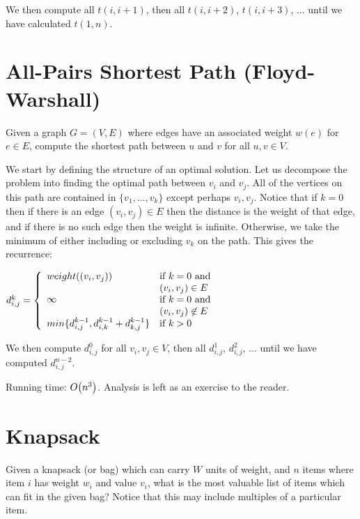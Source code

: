 We then compute all $t(i,i+1)$, then all $t(i,i+2)$, $t(i,i+3)$,
... until we have calculated $t(1,n)$.

\hypertarget{sec:floyd_warshall}{\section{All-Pairs Shortest Path
    (Floyd-Warshall)}}

Given a graph $G=(V,E)$ where edges have an associated weight $w(e)$
for $e \in E$, compute the shortest path between $u$ and $v$ for all
$u,v \in V$.

We start by defining the structure of an optimal solution.  Let us
decompose the problem into finding the optimal path between $v_i$ and
$v_j$.  All of the vertices on this path are contained in $\{
v_1,...,v_k \}$ except perhaps $v_i,v_j$.  Notice that if $k=0$ then
if there is an edge $(v_i,v_j) \in E$ then the distance is the weight
of that edge, and if there is no such edge then the weight is
infinite.  Otherwise, we take the minimum of either including or
excluding $v_k$ on the path.  This gives the recurrence:

\begin{math}
  d^k_{i,j} = \left\{
    \begin{array}{l l}
      weight((v_i,v_j)) & \text{if $k=0$ and} \\
                        & (v_i,v_j) \in E \\
      \infty            & \text{if $k=0$ and} \\
                        & (v_i,v_j) \not \in E \\
      min \{ d^{k-1}_{i,j},d^{k-1}_{i,k} + d^{k-1}_{k,j} \} & \text{if $k>0$}
    \end{array} \right.
\end{math}

We then compute $d^0_{i,j}$ for all $v_i,v_j \in V$, then all
$d^1_{i,j}$, $d^2_{i,j}$, ... until we have computed $d^{n-2}_{i,j}$.

Running time: $O\!\left(n^3\right)$.  Analysis is left as an exercise to the
reader.

\section{Knapsack}

Given a knapsack (or bag) which can carry $W$ units of weight, and $n$
items where item $i$ has weight $w_i$ and value $v_i$, what is the
most valuable list of items which can fit in the given bag?  Notice
that this may include multiples of a particular item.

